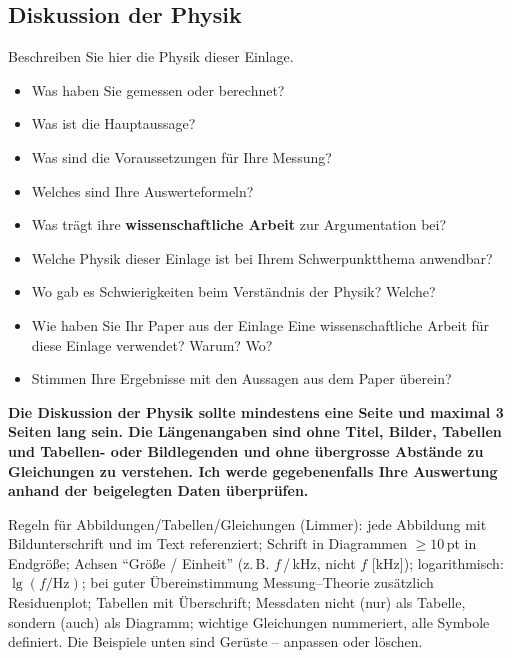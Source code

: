 \subsection{Diskussion der Physik}
\begin{hinweise}
Beschreiben Sie hier die Physik dieser Einlage.
\begin{itemize}\itemsep0pt
\item Was haben Sie gemessen oder berechnet?
\item Was ist die Hauptaussage?
\item Was sind die Voraussetzungen für Ihre Messung?
\item Welches sind Ihre Auswerteformeln?
\item Was trägt ihre \textbf{wissenschaftliche Arbeit} zur Argumentation bei?
\item Welche Physik dieser Einlage ist bei Ihrem Schwerpunktthema anwendbar?
\item Wo gab es Schwierigkeiten beim Verständnis der Physik? Welche?
\item Wie haben Sie Ihr Paper aus der Einlage \flqq Eine wissenschaftliche Arbeit\frqq{} für diese Einlage verwendet? Warum? Wo?
\item Stimmen Ihre Ergebnisse mit den Aussagen aus dem Paper überein?
\end{itemize}
\textbf{Die Diskussion der Physik sollte mindestens eine Seite und maximal 3 Seiten lang sein. Die
Längenangaben sind ohne Titel, Bilder, Tabellen und Tabellen- oder Bildlegenden und ohne übergrosse Abstände
zu Gleichungen zu verstehen. Ich werde gegebenenfalls Ihre Auswertung anhand der beigelegten Daten
überprüfen.}

\smallskip Regeln für Abbildungen/Tabellen/Gleichungen (Limmer): jede Abbildung mit Bildunterschrift und im
Text referenziert; Schrift in Diagrammen $\geq 10$\,pt in Endgröße; Achsen \enquote{Größe / Einheit}
(z.\,B. $f$\,/\,kHz, nicht $f$ [kHz]); logarithmisch: $\lg(f/\mathrm{Hz})$; bei guter Übereinstimmung
Messung--Theorie zusätzlich Residuenplot; Tabellen mit Überschrift; Messdaten nicht (nur) als Tabelle,
sondern (auch) als Diagramm; wichtige Gleichungen nummeriert, alle Symbole definiert.
Die Beispiele unten sind Gerüste -- anpassen oder löschen.
\end{hinweise}
